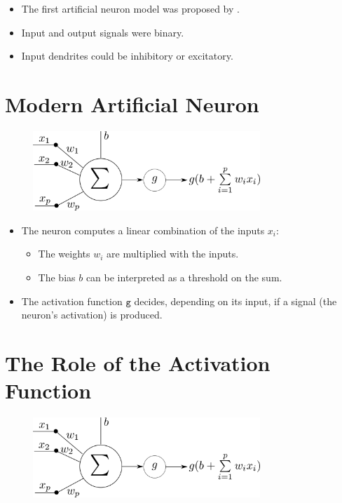 \documentclass{book}
\newcommand{\act}{\texttt{g}}%
\begin{document}
\begin{itemize}
\item The first artificial neuron model was proposed by \cite{mcculloch_logical_1943}.
\item Input and output signals were binary.
\item Input dendrites could be inhibitory or excitatory.
\end{itemize}

\section{Modern Artificial Neuron}

\begin{figure}[h]
    \centering
    \includegraphics[height=3cm]{neurone}
\end{figure}

\begin{itemize}
\item The neuron computes a linear combination of the inputs $x_i$:
    \begin{itemize}
    \item The weights $w_i$ are multiplied with the inputs.
    \item The bias $b$ can be interpreted as a threshold on the sum.
    \end{itemize}
\item The activation function $\act$ decides, depending on its input, if a signal (the neuron's activation) is produced.
\end{itemize}

\section{The Role of the Activation Function}

\begin{figure}[h]
    \centering
    \includegraphics[height=3cm]{neurone}
\end{figure}
\end{document}
